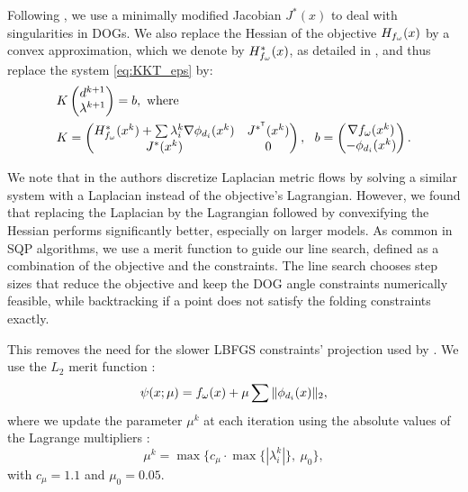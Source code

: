 Following \cite{rabi2018shape}, we use a minimally modified Jacobian $J^*(x)$ to deal with singularities in DOGs. We also replace the Hessian of the objective $H_{f_\omega}(x)$ by a convex approximation, which we denote by $H^*_{f_\omega}(x)$, as detailed in , and thus replace the system \eqref{eq:KKT_eps} by:
%
\begin{align} 
\label{eq:linear_system}
&{K} \begin{pmatrix} d^{k+1} \\ \lambda^{k+1} \end{pmatrix}={b}, \ \text{where} \\
\nonumber
&{K}=\begin{pmatrix}
{ H^*_{f_\omega}(\x^k)+\sum\lambda_i^{k} \nabla \phi_{d_i}(\x^k)} & {J^{*^\tr}(\x^k)}\\
{J^*(\x^k)} &  0 \\
\end{pmatrix}, \ \ 
{b}=\begin{pmatrix}
{\nabla f_\omega(x^k)} \\ 
-\phi_{d_i}(x^k)\\
\end{pmatrix}.
\end{align}

We note that in \cite{rabi2018shape} the authors discretize Laplacian metric flows by solving a similar system with a Laplacian instead of the objective's Lagrangian. However, we found that replacing the Laplacian by the Lagrangian followed by convexifying the Hessian performs significantly better, especially on larger models. As common in SQP algorithms, we use a merit function to guide our line search, defined as a combination of the objective and the constraints. The line search chooses step sizes that reduce the objective and keep the DOG angle constraints numerically feasible, while backtracking if a point does not satisfy the folding constraints exactly.

This removes the need for the slower LBFGS constraints' projection used by \cite{rabi18,rabi2018shape}. We use the $L_2$ merit function \cite{nocedal}:
\begin{equation}
\psi(x;\mu) = f_\omega(x)+\mu\sum\|\phi_{d_i}(x)\|_2,
\end{equation}
where we update the parameter $\mu^k$ at each iteration using the absolute values of the Lagrange multipliers \cite{nocedal}:
\begin{equation}
\mu^k = \max\{c_\mu \cdot \max\{|{\lambda_i^k}|\},\ \mu_0\},
\end{equation}
with $c_\mu = 1.1$ and $\mu_0 = 0.05$.

